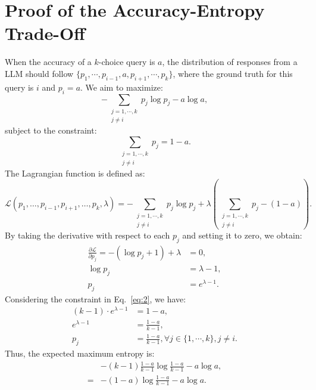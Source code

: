 \onecolumn
\appendix

\section{Proof of the Accuracy-Entropy Trade-Off}
\label{sec:proof}

When the accuracy of a $k$-choice query is $a$, the distribution of responses from a LLM should follow $\{p_1, \cdots, p_{i-1}, a, p_{i+1}, \cdots, p_k\}$, where the ground truth for this query is $i$ and $p_i = a$.
We aim to maximize:
\begin{equation}
    - \sum_{\substack{j=1, \cdots, k \\ j \neq i}} p_j \log p_j - a \log a,
\end{equation}
subject to the constraint:
\begin{equation}\label{eq:2}
    \sum_{\substack{j=1, \cdots, k \\ j \neq i}} p_j = 1 - a.
\end{equation}
The Lagrangian function is defined as:
\begin{equation}
    \mathcal{L}(p_1, \dots, p_{i - 1}, p_{i + 1}, \dots, p_k, \lambda) = - \sum_{\substack{j=1, \cdots, k \\ j \neq i}} p_j \log p_j + \lambda \left( \sum_{\substack{j=1, \cdots, k \\ j \neq i}} p_j - (1 - a) \right).
\end{equation}
By taking the derivative with respect to each $p_j$ and setting it to zero, we obtain:
\begin{align}
    \frac{\partial \mathcal{L}}{\partial p_j} = - (\log p_j + 1) + \lambda & = 0, \\
    \log p_j & = \lambda - 1, \\
    p_j & = e^{\lambda - 1}.
\end{align}
Considering the constraint in Eq.~\ref{eq:2}, we have:
\begin{align}
    (k - 1) \cdot e^{\lambda - 1} & = 1 - a, \\
    e^{\lambda - 1} & = \frac{1 - a}{k - 1}, \\
    p_j & = \frac{1 - a}{k - 1}, \forall j \in \{1, \cdots, k\}, j \neq i.
\end{align}
Thus, the expected maximum entropy is:
\begin{align}
    & - (k - 1) \frac{1 - a}{k - 1} \log \frac{1 - a}{k - 1} - a \log a, \\
    = & - (1 - a) \log \frac{1 - a}{k - 1} - a \log a.
\end{align}

